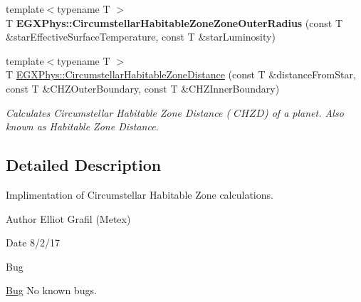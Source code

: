 \begin{DoxyCompactItemize}
{\footnotesize template$<$typename T $>$ }\\T {\bfseries E\+G\+X\+Phys\+::\+Circumstellar\+Habitable\+Zone\+Zone\+Outer\+Radius} (const T \&star\+Effective\+Surface\+Temperature, const T \&star\+Luminosity)
\item 
{\footnotesize template$<$typename T $>$ }\\T \hyperlink{group___astrophysics_gacf3a720793cdb27f6d93b170b44e81be}{E\+G\+X\+Phys\+::\+Circumstellar\+Habitable\+Zone\+Distance} (const T \&distance\+From\+Star, const T \&C\+H\+Z\+Outer\+Boundary, const T \&C\+H\+Z\+Inner\+Boundary)
\begin{DoxyCompactList}\small\item\em Calculates Circumstellar Habitable Zone Distance ( $CHZD$) of a planet. Also known as Habitable Zone Distance. \end{DoxyCompactList}\end{DoxyCompactItemize}


\subsection{Detailed Description}
Implimentation of Circumstellar Habitable Zone calculations. 

\begin{DoxyAuthor}{Author}
Elliot Grafil (Metex) 
\end{DoxyAuthor}
\begin{DoxyDate}{Date}
8/2/17 
\end{DoxyDate}
\begin{DoxyRefDesc}{Bug}
\item[\hyperlink{bug__bug000008}{Bug}]No known bugs. \end{DoxyRefDesc}
